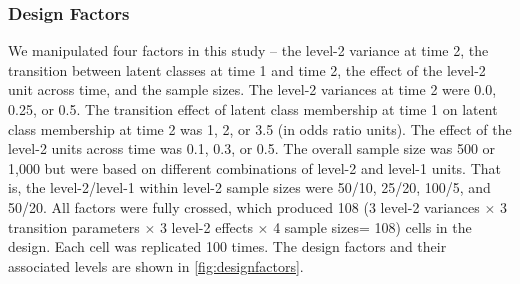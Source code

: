\documentclass[man, noextraspace, floatsintext, 12pt]{apa7}
\begin{document}
\subsubsection*{Design Factors}
We manipulated four factors in this study -- the level-2 variance at time 2, the transition between latent classes at time 1 and time 2, the effect of the level-2 unit across time, and the sample sizes. The level-2 variances at time 2 were 0.0, 0.25, or 0.5. The transition effect of latent class membership at time 1 on latent class membership at time 2 was 1, 2, or 3.5 (in odds ratio units). The effect of the level-2 units across time was 0.1, 0.3, or 0.5. The overall sample size was 500 or 1,000 but were based on different combinations of level-2 and level-1 units. That is, the level-2/level-1 within level-2 sample sizes were 50/10, 25/20, 100/5, and 50/20. All factors were fully crossed, which produced 108 (3 level-2 variances $\times$ 3 transition parameters $\times$ 3 level-2 effects $\times$ 4 sample sizes= 108) cells in the design. Each cell was replicated 100 times. The design factors and their associated levels are shown in \autoref{fig:designfactors}.
\end{document}
